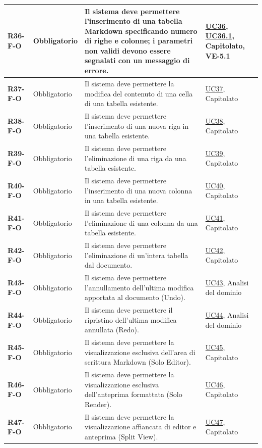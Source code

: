 \begin{longtable}{|p{2.5cm}|p{2.2cm}|p{6.8cm}|p{2.7cm}|}
	\textbf{R36-F-O} & Obbligatorio & Il sistema deve permettere l'inserimento di una tabella Markdown specificando numero di righe e colonne; i parametri non validi devono essere segnalati con un messaggio di errore. & \hyperlink{uc36}{UC36}, \hyperlink{uc36.1}{UC36.1}, Capitolato, VE-5.1 \\ \hline
	\textbf{R37-F-O} & Obbligatorio & Il sistema deve permettere la modifica del contenuto di una cella di una tabella esistente. & \hyperlink{uc37}{UC37}, Capitolato \\ \hline
	\textbf{R38-F-O} & Obbligatorio & Il sistema deve permettere l'inserimento di una nuova riga in una tabella esistente. & \hyperlink{uc38}{UC38}, Capitolato \\ \hline
	\textbf{R39-F-O} & Obbligatorio & Il sistema deve permettere l'eliminazione di una riga da una tabella esistente. & \hyperlink{uc39}{UC39}, Capitolato \\ \hline
	\textbf{R40-F-O} & Obbligatorio & Il sistema deve permettere l'inserimento di una nuova colonna in una tabella esistente. & \hyperlink{uc40}{UC40}, Capitolato \\ \hline
	\textbf{R41-F-O} & Obbligatorio & Il sistema deve permettere l'eliminazione di una colonna da una tabella esistente. & \hyperlink{uc41}{UC41}, Capitolato \\ \hline
	\textbf{R42-F-O} & Obbligatorio & Il sistema deve permettere l'eliminazione di un'intera tabella dal documento. & \hyperlink{uc42}{UC42}, Capitolato \\ \hline

	\textbf{R43-F-O} & Obbligatorio & Il sistema deve permettere l'annullamento dell'ultima modifica apportata al documento (Undo). & \hyperlink{uc43}{UC43}, Analisi del dominio \\ \hline
	\textbf{R44-F-O} & Obbligatorio & Il sistema deve permettere il ripristino dell'ultima modifica annullata (Redo). & \hyperlink{uc44}{UC44}, Analisi del dominio \\ \hline

	\textbf{R45-F-O} & Obbligatorio & Il sistema deve permettere la visualizzazione esclusiva dell'area di scrittura Markdown (Solo Editor). & \hyperlink{uc45}{UC45}, Capitolato \\ \hline
	\textbf{R46-F-O} & Obbligatorio & Il sistema deve permettere la visualizzazione esclusiva dell'anteprima formattata (Solo Render). & \hyperlink{uc46}{UC46}, Capitolato \\ \hline
	\textbf{R47-F-O} & Obbligatorio & Il sistema deve permettere la visualizzazione affiancata di editor e anteprima (Split View). & \hyperlink{uc47}{UC47}, Capitolato \\ \hline


\end{longtable}
